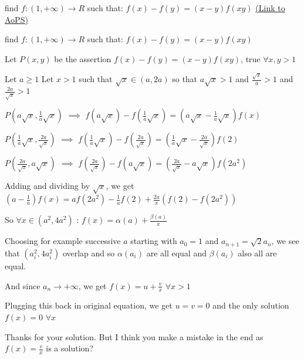 \begin{problem}
	find $f:(1,+\infty )\rightarrow R$ such that:
$f(x)-f(y)=(x-y)f(xy)$
	\flushright \href{https://artofproblemsolving.com/community/c6h548037}{(Link to AoPS)}
\end{problem}



\begin{solution}
	\begin{tcolorbox}find $f:(1,+\infty )\rightarrow R$ such that:
$f(x)-f(y)=(x-y)f(xy)$\end{tcolorbox}
Let $P(x,y)$ be the assertion $f(x)-f(y)=(x-y)f(xy)$, true $\forall x,y>1$

Let $a\ge 1$
Let $x>1$ such that $\sqrt x\in(a,2a)$ so that $a\sqrt x>1$ and $\frac{\sqrt x}a>1$ and $\frac{2a}{\sqrt x}>1$

$P(a\sqrt x,\frac 1a\sqrt x)$ $\implies$ $f(a\sqrt x)-f(\frac 1a\sqrt x)=(a\sqrt x-\frac 1a\sqrt x)f(x)$

$P(\frac 1a\sqrt x,\frac{2a}{\sqrt x})$ $\implies$ $f(\frac 1a\sqrt x)-f(\frac{2a}{\sqrt x})=(\frac 1a\sqrt x-\frac{2a}{\sqrt x})f(2)$

$P(\frac{2a}{\sqrt x},a\sqrt x)$ $\implies$ $f(\frac{2a}{\sqrt x})-f(a\sqrt x)=(\frac{2a}{\sqrt x}-a\sqrt x)f(2a^2)$

Adding and dividing by $\sqrt x$, we get $(a-\frac 1a)f(x)=af(2a^2)-\frac 1af(2)+\frac{2a}{x}(f(2)-f(2a^2))$

So $\forall x\in(a^2,4a^2)$ : $f(x)=\alpha(a)+\frac{\beta(a)}x$

Choosing for example successive $a$ starting with $a_0=1$ and $a_{n+1}=\sqrt 2a_n$, we see that $(a_i^2,4a_i^2)$ overlap and so $\alpha(a_i)$ are all equal and $\beta(a_i)$ also all are equal.

And since $a_n\to+\infty$, we get $f(x)=u+\frac vx$ $\forall x>1$

Plugging this back in original equation, we get $u=v=0$ and the only solution $\boxed{f(x)=0}$ $\forall x$
\end{solution}



\begin{solution}
	Thanks for your solution. But I think you make a mistake in the end as $f(x)=\frac{v}{x}$ is a solution?
\end{solution}



